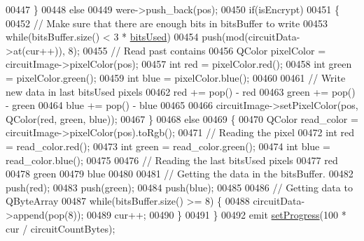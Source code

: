 \begin{DoxyCode}
00447     \}
00448     \textcolor{keywordflow}{else}
00449         were->push\_back(pos);
00450     \textcolor{keywordflow}{if}(isEncrypt)
00451     \{
00452         \textcolor{comment}{// Make sure that there are enough bits in bitsBuffer to write}
00453         \textcolor{keywordflow}{while}(bitsBuffer.size() < 3 * \mbox{\hyperlink{class_model_p_c_a655deb6a8afa94c7f4aadb3056989038}{bitsUsed}})
00454             push(mod(circuitData->at(cur++)), 8);
00455         \textcolor{comment}{// Read past contains}
00456         QColor pixelColor = circuitImage->pixelColor(pos);
00457         \textcolor{keywordtype}{int} red = pixelColor.red();
00458         \textcolor{keywordtype}{int} green = pixelColor.green();
00459         \textcolor{keywordtype}{int} blue = pixelColor.blue();
00460 
00461         \textcolor{comment}{// Write new data in last bitsUsed pixels}
00462         red += pop() - red %
00463         green += pop() - green %
00464         blue += pop() - blue %
00465 
00466         circuitImage->setPixelColor(pos, QColor(red, green, blue));
00467     \}
00468     \textcolor{keywordflow}{else}
00469     \{
00470         QColor read\_color = circuitImage->pixelColor(pos).toRgb();
00471         \textcolor{comment}{// Reading the pixel}
00472         \textcolor{keywordtype}{int} red = read\_color.red();
00473         \textcolor{keywordtype}{int} green = read\_color.green();
00474         \textcolor{keywordtype}{int} blue = read\_color.blue();
00475 
00476         \textcolor{comment}{// Reading the last bitsUsed pixels}
00477         red %
00478         green %
00479         blue %
00480 
00481         \textcolor{comment}{// Getting the data in the bitsBuffer.}
00482         push(red);
00483         push(green);
00484         push(blue);
00485 
00486         \textcolor{comment}{// Getting data to QByteArray}
00487         \textcolor{keywordflow}{while}(bitsBuffer.size() >= 8) \{
00488             circuitData->append(pop(8));
00489             cur++;
00490         \}
00491     \}
00492     emit \mbox{\hyperlink{class_model_p_c_a25a4496e129e87ac96f12257a123b84f}{setProgress}}(100 * cur / circuitCountBytes);

\end{DoxyCode}
